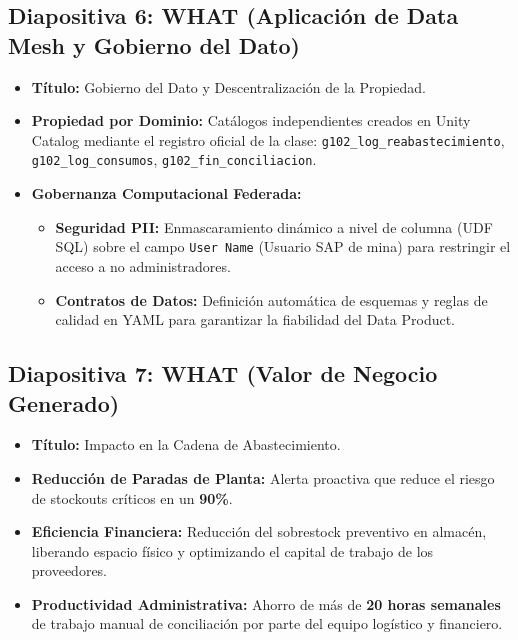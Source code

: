 \documentclass[11pt,a4paper]{article}
\begin{document}
\subsection{Diapositiva 6: WHAT (Aplicación de Data Mesh y Gobierno del Dato)}
\begin{itemize}[label=$\bullet$]
    \item \textbf{Título:} Gobierno del Dato y Descentralización de la Propiedad.
    \item \textbf{Propiedad por Dominio:} Catálogos independientes creados en Unity Catalog mediante el registro oficial de la clase: \texttt{g102\_log\_reabastecimiento}, \texttt{g102\_log\_consumos}, \texttt{g102\_fin\_conciliacion}.
    \item \textbf{Gobernanza Computacional Federada:}
    \begin{itemize}[label=--]
        \item \textbf{Seguridad PII:} Enmascaramiento dinámico a nivel de columna (UDF SQL) sobre el campo \texttt{User Name} (Usuario SAP de mina) para restringir el acceso a no administradores.
        \item \textbf{Contratos de Datos:} Definición automática de esquemas y reglas de calidad en YAML para garantizar la fiabilidad del Data Product.
    \end{itemize}
\end{itemize}

\subsection{Diapositiva 7: WHAT (Valor de Negocio Generado)}
\begin{itemize}[label=$\bullet$]
    \item \textbf{Título:} Impacto en la Cadena de Abastecimiento.
    \item \textbf{Reducción de Paradas de Planta:} Alerta proactiva que reduce el riesgo de stockouts críticos en un \textbf{90\%}.
    \item \textbf{Eficiencia Financiera:} Reducción del sobrestock preventivo en almacén, liberando espacio físico y optimizando el capital de trabajo de los proveedores.
    \item \textbf{Productividad Administrativa:} Ahorro de más de \textbf{20 horas semanales} de trabajo manual de conciliación por parte del equipo logístico y financiero.
\end{itemize}
\end{document}
